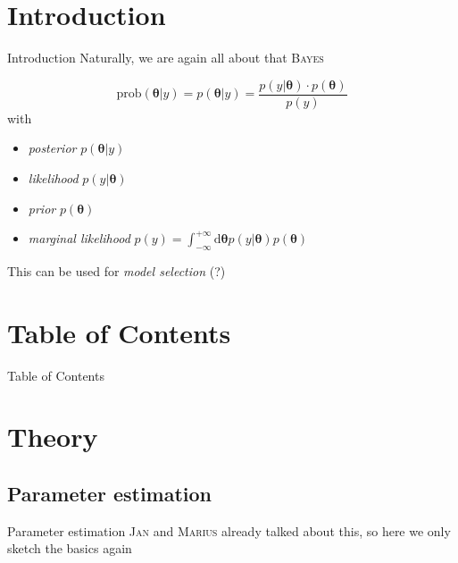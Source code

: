 \documentclass[11pt,aspectratio=1610,dvipsnames]{beamer}
\newcommand{\btheta}{\boldsymbol{\theta}}
\begin{document}

\section*{Introduction}
\begin{frame}{Introduction}
	Naturally, we are again all about that \textsc{Bayes}
	\begin{tcolorbox}[colback=black!5,colframe=gray!15!black,title=\textsc{Bayes'} Theorem] 
		$$\text{prob}(\btheta|y)=p(\btheta|y)= \frac{p(y|\boldsymbol{\theta})\cdot p(\boldsymbol{\theta})}{p(y)}$$
		with
		\begin{itemize}
			\item \emph{posterior} $p(\btheta|y)$\\
			\item \emph{likelihood} $p(y|\boldsymbol{\theta})$\\
			\item \emph{prior} $p(\boldsymbol{\theta})$\\
			\item \emph{marginal likelihood} $p(y)=\int_{-\infty}^{+\infty}\text{d}\boldsymbol{\theta} p(y|\boldsymbol{\theta})p(\boldsymbol{\theta})$\\
		\end{itemize}
\end{tcolorbox}
This can be used for \emph{model selection} (?)
\end{frame}


\section*{Table of Contents}

\begin{frame}{Table of Contents}
	\tableofcontents
\end{frame}

\section{Theory}
\subsection{Parameter estimation}
\begin{frame}{Parameter estimation}
	\textsc{Jan} and \textsc{Marius} already talked about this, so here we only sketch the basics again
\end{frame}
\end{document}
